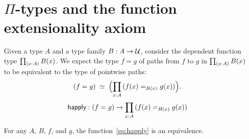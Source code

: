 \documentclass[hott-all.tex]{subfiles}
\begin{document}
\section{\texorpdfstring{$\Pi$}{Π}-types and the function extensionality axiom}
\label{sec:compute-pi}
%
Given a type $A$ and a type family $B : A \to \mathcal{U}$, consider the dependent function type $\prd{x:A}B(x)$.
We expect the type $f=g$ of paths from $f$ to $g$ in $\prd{x:A} B(x)$ to be equivalent to
the type of pointwise paths:
\begin{equation}
 \eqvspaced{(\id{f}{g})}{\Parens{\prd{x:A} (\id[B(x)]{f(x)}{g(x)})}}.\label{eq:path-forall}
\end{equation}
%
\begin{equation}\label{eq:happly}
  \happly : (\id{f}{g}) \to \prd{x:A} (\id[B(x)]{f(x)}{g(x)})
\end{equation}
%
\begin{axiom}\label{axiom:funext}
  For any $A$, $B$, $f$, and $g$, the function~\eqref{eq:happly} is an equivalence.
\end{axiom}
\end{document}
